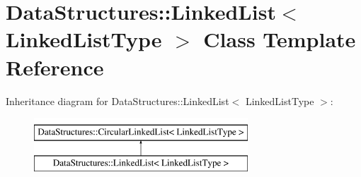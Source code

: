 \hypertarget{class_data_structures_1_1_linked_list}{\section{Data\-Structures\-:\-:Linked\-List$<$ Linked\-List\-Type $>$ Class Template Reference}
\label{class_data_structures_1_1_linked_list}
}
Inheritance diagram for Data\-Structures\-:\-:Linked\-List$<$ Linked\-List\-Type $>$\-:\begin{figure}[H]
\begin{center}
\leavevmode
\includegraphics[height=2.000000cm]{class_data_structures_1_1_linked_list}
\end{center}
\end{figure}

